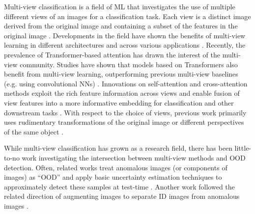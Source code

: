 Multi-view classification is a field of ML that investigates the use of multiple different views of an images for a classification task. Each view is a distinct image derived from the original image and containing a subset of the features in the original image \cite{seeland2021multi}. Developments in the field have shown the benefits of multi-view learning in different architectures and across various applications \cite{su2015multi,zhao2023cddfuse,liu2019multi,zhan2023cfnet}. Recently, the prevalence of Transformer-based attention \cite{dosovitskiy2020image} has drawn the interest of the multi-view community. Studies have shown that models based on Transformers also benefit from multi-view learning, outperforming previous multi-view baselines (e.g. using convolutional NNs) \cite{zhao2023cddfuse,chen2021crossvit}. Innovations on self-attention and cross-attention methods \cite{frank2021vision} exploit the rich feature information across views \cite{li2023mvhanet} and enable fusion of view features into a more informative embedding for classification and other downstream tasks \cite{wang2024mutualformer,ke2024rethinking}. With respect to the choice of views, previous work primarily uses rudimentary transformations of the original image or different perspectives of the same object \cite{geng2023foreground}.

While multi-view classification has grown as a research field, there has been little-to-no work investigating the intersection between multi-view methods and OOD detection. Often, related works treat anomalous images (or components of images) as ``OOD'' and apply basic uncertainty estimation techniques to approximately detect these samples at test-time \cite{fernandez2023out,jung2022uncertainty}. Another work followed the related direction of augmenting images to separate ID images from anomalous images \cite{radford2021learning}.

